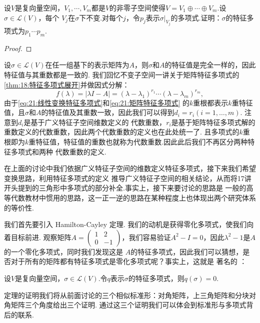 \begin{example}
    设$V$是复向量空间，$V_1,\cdots,V_m$都是$V$的非零子空间使得$V=V_1\oplus\cdots\oplus V_m$.设$\sigma\in \mathcal{L}(V)$，每个
    $V_j$在$\sigma$下不变.对每个$j$，令$p_j$表示$\sigma|_{V_j}$的多项式.证明：$\sigma$的特征多项式为$p_1\cdots p_m$.
\end{example}
\begin{proof}
    
\end{proof}

设$\sigma\in\mathcal{L}(V)$在任一组基下的表示矩阵为$A$，则$\sigma$和$A$的特征值是完全一样的，因此特征值与其重数都是一致的.
我们回忆不变子空间一讲关于矩阵特征多项式的\autoref{thm:18:特征多项式展开}并做因式分解：
\begin{equation}\label{eq:21:矩阵特征多项式}
    f(\lambda)=|\lambda I-A|=(\lambda-\lambda_1)^{r_1}\cdots(\lambda-\lambda_m)^{r_m},
\end{equation}
由于\autoref{eq:21:线性变换特征多项式}和\autoref{eq:21:矩阵特征多项式}
的$k$重根都表示$k$重特征值，且$\sigma$和$A$的特征值及其重数一致，因此我们可以得到$d_i=r_i(i=1,\ldots,m)$.
注意到$d_i$是基于广义特征子空间维数定义的
代数重数，$r_i$是基于矩阵特征多项式解的重数定义的代数重数，因此两个代数重数的定义也在此处统一了.
且多项式的$k$重根即为$k$重特征值，特征值的重数也就称为代数重数.因此此后我们不再区分两种特征多项式和两种
代数重数的定义.

在上面的讨论中我们依据广义特征子空间的维数定义特征多项式，接下来我们希望变换思路，利用特征多项式的定义
推导广义特征子空间的相关结论，从而将17讲开头提到的三角形中多项式的部分补全.事实上，接下来要讨论的思路是
一般的高等代数教材中惯用的思路，这一正一逆的思路在某种程度上也体现出两个研究体系的等价性.

我们首先要引入 Hamilton-Cayley 定理. 我们的动机是获得零化多项式，使我们向着目标前进. 观察矩阵$A=\begin{pmatrix}
    1 & 2 \\ 0 & -1
\end{pmatrix}$，我们容易验证$A^2-I=0$，因此$\lambda^2-1$是$A$的一个零化多项式，同时我们发现这是
$A$的特征多项式，因此我们可以猜想，是否对于所有的矩阵都有特征多项式是零化多项式呢？事实上，这就是
著名的 ：
\begin{theorem} \label{thm:21:HC}
    设$V$是复向量空间，$\sigma\in \mathcal{L}(V)$.令$q$表示$\sigma$的特征多项式，则$q(\sigma)=0$.
\end{theorem}
定理的证明我们将从前面讨论的三个相似标准形：对角矩阵，上三角矩阵和分块对角矩阵三个角度给出三个证明.
通过这三个证明我们可以体会到标准形与多项式背后的联系.

